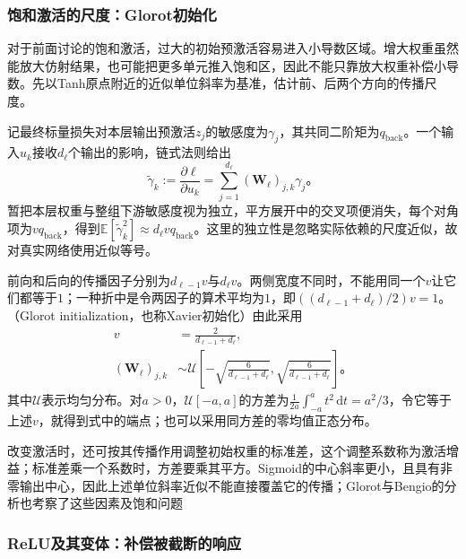 \subsubsection{饱和激活的尺度：Glorot初始化}
\label{sec:ffn-initialization-saturating}

对于前面讨论的饱和激活，过大的初始预激活容易进入小导数区域。增大权重虽然能放大仿射结果，也可能把更多单元推入饱和区，因此不能只靠放大权重补偿小导数。先以Tanh原点附近的近似单位斜率为基准，估计前、后两个方向的传播尺度。

记最终标量损失对本层输出预激活$z_j$的敏感度为$\gamma_j$，其共同二阶矩为$q_{\mathrm{back}}$。一个输入$u_k$接收$d_\ell$个输出的影响，链式法则给出
\[
  \widetilde\gamma_k
  :=\frac{\partial\ell}{\partial u_k}
  =\sum_{j=1}^{d_\ell}(\bm W_\ell)_{j,k}\gamma_j\text{。}
\]
暂把本层权重与整组下游敏感度视为独立，平方展开中的交叉项便消失，每个对角项为$v q_{\mathrm{back}}$，得到$\mathbb E[\widetilde\gamma_k^2]\approx d_\ell v q_{\mathrm{back}}$。这里的独立性是忽略实际依赖的尺度近似，故对真实网络使用近似等号。

前向和后向的传播因子分别为$d_{\ell-1}v$与$d_\ell v$。两侧宽度不同时，不能用同一个$v$让它们都等于$1$；一种折中是令两因子的算术平均为$1$，即$((d_{\ell-1}+d_\ell)/2)v=1$。（Glorot initialization，也称Xavier初始化）由此采用
\begin{equation}
  \begin{aligned}
    v&=\frac{2}{d_{\ell-1}+d_\ell},\\
    (\bm{W}_\ell)_{j,k}&\sim
    \mathcal{U}\!\left[-\sqrt{\frac{6}{d_{\ell-1}+d_\ell}},
    \sqrt{\frac{6}{d_{\ell-1}+d_\ell}}\right]\text{。}
  \end{aligned}
  \label{eq:ffn-glorot-initialization}
\end{equation}
其中$\mathcal U$表示均匀分布。对$a>0$，$\mathcal U[-a,a]$的方差为$\frac1{2a}\int_{-a}^{a}t^2\,\mathrm dt=a^2/3$，令它等于上述$v$，就得到式中的端点；也可以采用同方差的零均值正态分布。

改变激活时，还可按其传播作用调整初始权重的标准差，这个调整系数称为激活增益；标准差乘一个系数时，方差要乘其平方。Sigmoid的中心斜率更小，且具有非零输出中心，因此上述单位斜率近似不能直接覆盖它的传播；Glorot与Bengio的分析也考察了这些因素及饱和问题

\subsubsection{ReLU及其变体：补偿被截断的响应}
\label{sec:ffn-initialization-rectifiers}

